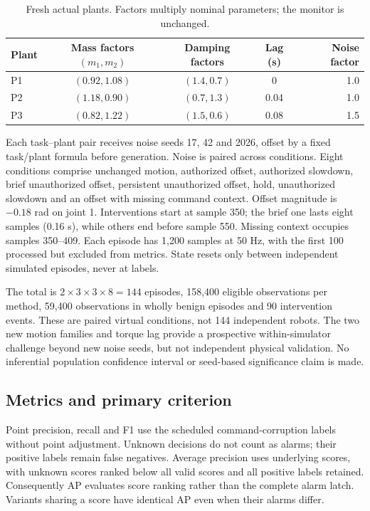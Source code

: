 \begin{table}[htbp]\centering\small
\caption{Fresh actual plants. Factors multiply nominal parameters; the monitor is unchanged.}
\begin{tabular}{lcccr}\toprule
Plant & Mass factors $(m_1,m_2)$ & Damping factors & Lag (s) & Noise factor\\\midrule
P1 & $(0.92,1.08)$ & $(1.4,0.7)$ & 0 & 1.0\\
P2 & $(1.18,0.90)$ & $(0.7,1.3)$ & 0.04 & 1.0\\
P3 & $(0.82,1.22)$ & $(1.5,0.6)$ & 0.08 & 1.5\\\bottomrule
\end{tabular}\label{tab:plants}
\end{table}

Each task--plant pair receives noise seeds 17, 42 and 2026, offset by a fixed task/plant formula before generation. Noise is paired across conditions. Eight conditions comprise unchanged motion, authorized offset, authorized slowdown, brief unauthorized offset, persistent unauthorized offset, hold, unauthorized slowdown and an offset with missing command context. Offset magnitude is $-0.18$ rad on joint 1. Interventions start at sample 350; the brief one lasts eight samples (0.16 s), while others end before sample 550. Missing context occupies samples 350--409. Each episode has 1,200 samples at 50 Hz, with the first 100 processed but excluded from metrics. State resets only between independent simulated episodes, never at labels.

The total is $2\times3\times3\times8=144$ episodes, 158,400 eligible observations per method, 59,400 observations in wholly benign episodes and 90 intervention events. These are paired virtual conditions, not 144 independent robots. The two new motion families and torque lag provide a prospective within-simulator challenge beyond new noise seeds, but not independent physical validation. No inferential population confidence interval or seed-based significance claim is made.

\subsection{Metrics and primary criterion}
Point precision, recall and F1 use the scheduled command-corruption labels without point adjustment. Unknown decisions do not count as alarms; their positive labels remain false negatives. Average precision uses underlying scores, with unknown scores ranked below all valid scores and all positive labels retained. Consequently AP evaluates score ranking rather than the complete alarm latch. Variants sharing a score have identical AP even when their alarms differ.

